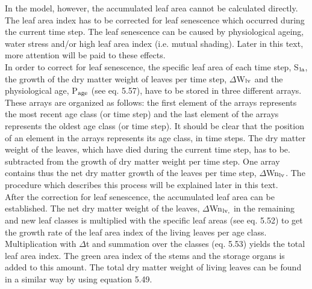\documentclass[11pt]{article}
\newcommand{\FigDir}{.}
\begin{document}
\bigskip
\bigskip
In the model, however, the accumulated leaf area cannot be calculated directly. The leaf
area index has to be corrected for leaf senescence which occurred during the current time
step. The leaf senescence can be caused by physiologi\-cal ageing, water stress and/or high
leaf area index (i.e. mutual shading). Later in this text, more attention will be paid to
these effects.\\
In order to correct for leaf senescence, the specific leaf area of each time step, S$_{{\rm la}}$, the
growth of the dry matter weight of leaves per time step, $\Delta$W$_{{\rm lv}}$ and the physiological age,
P$_{{\rm age}}$ (see eq. 5.57), have to be stored in three different arrays. These arrays are organized
as follows: the first element of the arrays represents the most recent age class (or time
step) and the last element of the arrays represents the oldest age class (or time step). It
should be clear that the position of an element in the arrays represents its age class, in
time steps. The dry matter weight of the leaves, which have died during the current time
step, has to be. subtract\-ed from the growth of dry matter weight per time step. One array
contains thus the net dry matter growth of the leaves per time step, $\Delta$Wn$_{{\rm lv}}$. The procedure
which describes this process will be explained later in this text. \\
After the correction for leaf senescence, the accumulat\-ed leaf area can be established. The
net dry matter weight of the leaves, $\Delta$Wn$_{{\rm lv,}}$  in the remaining and new leaf classes is
multiplied with the specific leaf areas (see eq. 5.52) to get the growth rate of the leaf area
index of the living leaves per age class. Multiplication with $\Delta$t and summa\-tion over the
classes (eq. 5.53) yields the total leaf area index. The green area index of the stems and
the storage organs is added to this amount. The total dry matter weight of living leaves
can be found in a similar way by using equation 5.49. \\
\begin{figure}[htbp]
\begin{forcewidth}{10.05cm}
 \begin{center}\InputPS{\FigDir/SLATB.eps} \end{center}
\end{forcewidth}
\end{figure}

\bigskip
\bigskip
\bigskip
\bigskip
\bigskip
\bigskip
\bigskip
\bigskip
\bigskip
 
\end{document}
